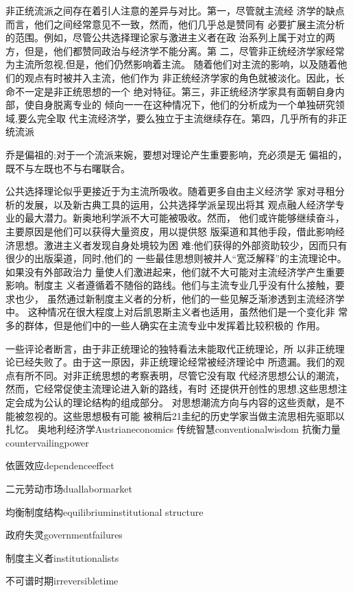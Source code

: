 非正统流派之间存在着引人注意的差异与对比。第一，尽管就主流经
济学的缺点而言，他们之间经常意见不一致，然而，他们几乎总是赞同有
必要扩展主流分析的范围。例如，尽管公共选择理论家与激进主义者在政
治系列上属于对立的两方，但是，他们都赞同政治与经济学不能分离。第
二，尽管非正统经济学家经常为主流所忽视,但是，他们仍然影响着主流。
随着他们对主流的影响，以及随着他们的观点有时被并入主流，他们作为
非正统经济学家的角色就被淡化。因此，长命不一定是非正统思想的一个
绝对特征。第三，非正统经济学家具有面朝自身内部，使自身脱离专业的
倾向一一在这种情况下，他们的分析成为一个单独研究领域,要么完全取
代主流经济学，要么独立于主流继续存在。第四，几乎所有的非正统流派




乔是偏祖的;对于一个流派来婉，要想对理论产生重要影响，充必须是无
偏祖的，既不与左既也不与右曙联合。

公共选择理论似乎更接近于为主流所吸收。随着更多自由主义经济学
家对寻租分析的发展，以及新古典工具的运用，公共选择学派呈现出将其
观点融人经济学专业的最大潜力。新奥地利学派不大可能被吸收。然而，
他们或许能够继续奋斗，主要原因是他们可以获得大量资皮，用以提供怒
版渠道和其他手段，借此影响经济思想。激进主义者发现自身处境较为困
难:他们获得的外部资助较少，因而只有很少的出版渠道，同时,他们的
一些最佳思想则被并人“宽泛解释”的主流理论中。如果没有外部政治力
量使人们激进起来，他们就不大可能对主流经济学产生重要影响。制度主
义者遵循着不随俗的路线。他们与主流专业几乎没有什么接触，要求也少，
虽然通过新制度主义者的分析，他们的一些见解乏渐渗透到主流经济学中。
这种情况在很大程度上对后凯恩斯主义者也适用，虽然他们是一个变化非
常多的群体，但是他们中的一些人确实在主流专业中发挥着比较积极的
作用。

一些评论者断言，由于非正统理论的独特看法未能取代正统理论，所
以非正统理论已经失败了。由于这一原因，非正统理论经常被经济理论中
所遗漏。我们的观点有所不同。对非正统思想的考察表明，尽管它没有取
代经济思想公认的潮流，然而，它经常促使主流理论进入新的路线，有时
还提供开创性的思想,这些思想注定会成为公认的理论结构的组成部分。
对思想潮流方向与内容的这些贡献，是不能被忽视的。这些思想极有可能
被稍后21圭纪的历史学家当做主流思相先驱耶以扎忆。
奥地利经济学Austrianeconomics
传统智慧conventionalwisdom
抗衡力量countervailingpower

依匮效应dependenceeffect

二元劳动市场duallabormarket

均衡制度结构equilibriuminstitutional
structure

政府失灵governmentfailures

制度主义者institutionalists

不可谱时期irreversibletime


